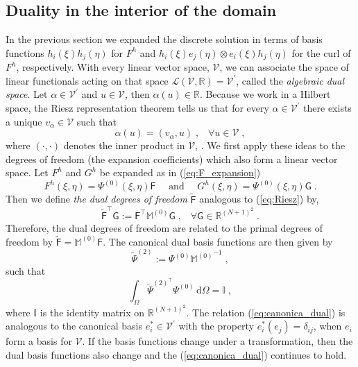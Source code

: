 \documentclass[graybox]{svmult}
\begin{document}
\subsection{Duality in the interior of the domain}
In the previous section we expanded the discrete solution in terms of basis functions $h_i(\xi)h_j(\eta)$ for $F^h$ and $h_i(\xi)e_j(\eta) \otimes e_i(\xi)h_j(\eta)$ for the curl of $F^h$, respectively. With every linear vector space, $\mathcal{V}$, we can associate the space of linear functionals acting on that space $\mathcal{L}(\mathcal{V},\mathbb{R})=\mathcal{V}^{\prime}$, called the {\em algebraic dual space}. Let $\alpha \in \mathcal{V}^{\prime}$ and $u\in \mathcal{V}$, then $\alpha(u)\in \mathbb{R}$. Because we work in a Hilbert space, the Riesz representation theorem tells us that for every $\alpha \in \mathcal{V}^{\prime}$ there exists a unique $v_{\alpha} \in \mathcal{V}$ such that
\begin{equation}
\alpha(u) = (v_{\alpha},u)\;,\;\;\; \forall u \in \mathcal{V} \;,
\label{eq:Riesz}
\end{equation}
where $(\cdot,\cdot)$ denotes the inner product in $\mathcal{V}$, \cite{Kreyszig,OdenDemkowicz}. We first apply these ideas to the degrees of freedom (the expansion coefficients) which also form a linear vector space. Let $F^h$ and $G^h$ be expanded as in (\ref{eq:F_expansion})
\[ F^h(\xi,\eta) = \Psi^{(0)}(\xi,\eta) \mathsf{F}\quad \mbox{ and } \quad  G^h(\xi,\eta) = \Psi^{(0)}(\xi,\eta) \mathsf{G} \;.\]
Then we define {\em the dual degrees of freedom} $\widetilde{\mathsf{F}}$ analogous to (\ref{eq:Riesz}) by, \cite{Jain,Yi}
\begin{equation}
\widetilde{\mathsf{F}}^{\top} \mathsf{G}:= \mathsf{F}^{\top} \mathbb{M}^{(0)} \mathsf{G} \;, \;\;\; \forall \mathsf{G} \in \mathbb{R}^{(N+1)^2} \;.
\end{equation}
Therefore, the dual degrees of freedom are related to the primal degrees of freedom by $\widetilde{\mathsf{F}} = \mathbb{M}^{(0)} \mathsf{F}$. The canonical dual basis functions are then given by
\begin{equation}
\widetilde{\Psi}^{(2)} := \Psi^{(0)} {\mathbb{M}^{(0)}}^{-1}\;,
\label{eq:dual_volume_basis}
\end{equation}
such that
\begin{equation}
\int_{\Omega} {\widetilde{\Psi}^{(2)^{\top}}} \Psi^{(0)} \,\mathrm{d}\Omega = \mathbb{I} \;,
\label{eq:canonica_dual}
\end{equation}
where $\mathbb{I}$ is the identity matrix on $\mathbb{R}^{(N+1)^2}$. The relation (\ref{eq:canonica_dual}) is analogous to the canonical basis $e^*_i \in \mathcal{V}^{\prime}$ with the property $e^*_i(e_j) = \delta_{ij}$, when $e_i$ form a basis for $\mathcal{V}$. If the basis functions change under a transformation, then the dual basis functions also change and the (\ref{eq:canonica_dual}) continues to hold.
\end{document}
